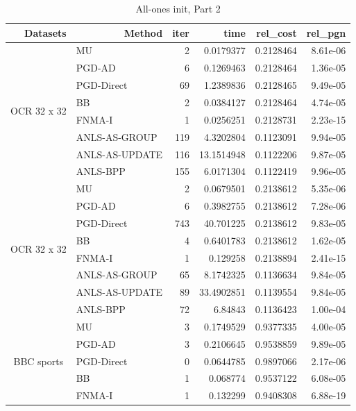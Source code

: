 \documentclass[conference,onecolumn,12pt]{IEEEtran}
\numberwithin{equation}{section}
\numberwithin{figure}{section}
\numberwithin{table}{section}
\theoremstyle{definition}
\begin{document}
\begin{table}[htbp]
	\centering
	\caption{All-ones init, Part 2}
	  \begin{tabular}{clrrrr}
		\toprule
	  \multicolumn{1}{r}{Datasets} & \multicolumn{1}{r}{Method} & iter  & time  & rel\_cost & rel\_pgn \\
	  \midrule
	  \multirow{8}[0]{*}{OCR 32 x 32} & MU    & 2     & 0.0179377 & 0.2128464 & 8.61e-06 \\
			& PGD-AD & 6     & 0.1269463 & 0.2128464 & 1.36e-05 \\
			& PGD-Direct & 69    & 1.2389836 & 0.2128465 & 9.49e-05 \\
			& BB    & 2     & 0.0384127 & 0.2128464 & 4.74e-05 \\
			& FNMA-I & 1     & 0.0256251 & 0.2128731 & 2.23e-15 \\
			& ANLS-AS-GROUP & 119   & 4.3202804 & 0.1123091 & 9.94e-05 \\
			& ANLS-AS-UPDATE & 116   & 13.1514948 & 0.1122206 & 9.87e-05 \\
			& ANLS-BPP & 155   & 6.0171304 & 0.1122419 & 9.96e-05 \\
			\midrule
	  \multirow{8}[0]{*}{OCR 32 x 32} & MU    & 2     & 0.0679501 & 0.2138612 & 5.35e-06 \\
			& PGD-AD & 6     & 0.3982755 & 0.2138612 & 7.28e-06 \\
			& PGD-Direct & 743   & 40.701225 & 0.2138612 & 9.83e-05 \\
			& BB    & 4     & 0.6401783 & 0.2138612 & 1.62e-05 \\
			& FNMA-I & 1     & 0.129258 & 0.2138894 & 2.41e-15 \\
			& ANLS-AS-GROUP & 65    & 8.1742325 & 0.1136634 & 9.84e-05 \\
			& ANLS-AS-UPDATE & 89    & 33.4902851 & 0.1139554 & 9.84e-05 \\
			& ANLS-BPP & 72    & 6.84843 & 0.1136423 & 1.00e-04 \\
			\midrule
	  \multirow{8}[0]{*}{BBC sports} & MU    & 3     & 0.1749529 & 0.9377335 & 4.00e-05 \\
			& PGD-AD & 3     & 0.2106645 & 0.9538859 & 9.89e-05 \\
			& PGD-Direct & 0     & 0.0644785 & 0.9897066 & 2.17e-06 \\
			& BB    & 1     & 0.068774 & 0.9537122 & 6.08e-05 \\
			& FNMA-I & 1     & 0.132299 & 0.9408308 & 6.88e-19 \\

\end{tabular}
\end{table}
\end{document}
